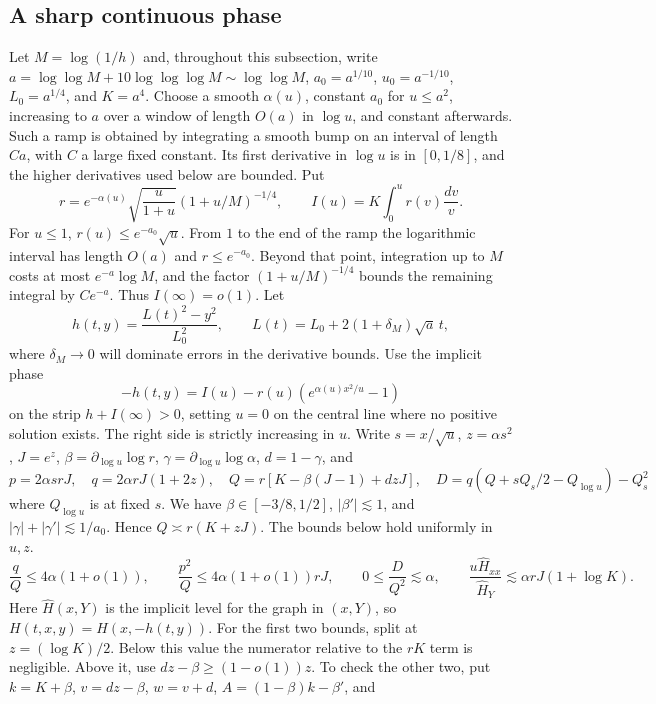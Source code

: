 \documentclass[11pt]{article}
\newcommand{\1}{\mathbf{1}}
\numberwithin{equation}{section}
\begin{document}
\subsection{A sharp continuous phase}\label{sec:sharp-phase}
Let \(M=\log(1/h)\) and, throughout this subsection, write
\(a=\log\log M+10\log\log\log M\sim\log\log M\), \(a_0=a^{1/10}\),
\(u_0=a^{-1/10}\), \(L_0=a^{1/4}\), and \(K=a^4\). Choose a smooth
\(\alpha(u)\), constant \(a_0\) for \(u\le a^2\), increasing to
\(a\) over a window of length \(O(a)\) in \(\log u\), and constant
afterwards. Such a ramp is obtained by integrating a smooth bump on
an interval of length \(C a\), with \(C\) a large fixed constant.
Its first derivative in \(\log u\) is in \([0,1/8]\), and the
higher derivatives used below are bounded. Put
\[
 r=e^{-\alpha(u)}\sqrt{\frac{u}{1+u}}(1+u/M)^{-1/4},
 \qquad I(u)=K\int_0^u r(v)\frac{dv}{v}.
\]
For \(u\le1\), \(r(u)\le e^{-a_0}\sqrt u\). From \(1\) to
the end of the ramp the logarithmic interval has length \(O(a)\)
and \(r\le e^{-a_0}\). Beyond that point, integration up to \(M\)
costs at most \(e^{-a}\log M\), and the factor \((1+u/M)^{-1/4}\)
bounds the remaining integral by \(C e^{-a}\). Thus
\(I(\infty)=o(1)\). Let
\[
 h(t,y)=\frac{L(t)^2-y^2}{L_0^2},\qquad
 L(t)=L_0+2(1+\delta_M)\sqrt a\,t,
\]
where \(\delta_M\to0\) will dominate errors in the derivative bounds.
Use the implicit phase
\[
 -h(t,y)=I(u)-r(u)(e^{\alpha(u)x^2/u}-1)
\]
on the strip \(h+I(\infty)>0\), setting \(u=0\) on the central
line where no positive solution exists. The right side is strictly
increasing in \(u\). Write \(s=x/\sqrt u\), \(z=\alpha s^2\),
\(J=e^z\), \(\beta=\partial_{\log u}\log r\),
\(\gamma=\partial_{\log u}\log\alpha\), \(d=1-\gamma\), and
\[
 p=2\alpha s rJ,\quad q=2\alpha rJ(1+2z),\quad
 Q=r[K-\beta(J-1)+dzJ],\quad
 D=q(Q+sQ_s/2-Q_{\log u})-Q_s^2
\]
where \(Q_{\log u}\) is at fixed \(s\).
We have \(\beta\in[-3/8,1/2]\), \(|\beta'|\lesssim1\), and
\(|\gamma|+|\gamma'|\lesssim 1/a_0\). Hence \(Q\asymp r(K+zJ)\).
The bounds below hold uniformly in \(u,z\).
\[
 \frac qQ\le4\alpha(1+o(1)),\qquad
 \frac{p^2}Q\le4\alpha(1+o(1))rJ,\qquad
 0\le\frac{D}{Q^2}\lesssim\alpha,\qquad
 \frac{u\widehat H_{xx}}{\widehat H_Y}\lesssim
     \alpha rJ(1+\log K).
\]
Here \(\widehat H(x,Y)\) is the implicit level for the graph in
\((x,Y)\), so \(H(t,x,y)=\widehat H(x,-h(t,y))\).
For the first two bounds, split at \(z=(\log K)/2\). Below this
value the numerator relative to the \(rK\) term is negligible.
Above it, use \(dz-\beta\ge(1-o(1))z\).
To check the other two, put \(k=K+\beta\), \(v=dz-\beta\),
\(w=v+d\), \(A=(1-\beta)k-\beta'\), and
\end{document}
